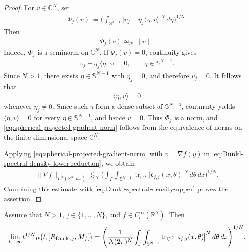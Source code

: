 \documentclass{amsart}
\begin{document}
\begin{proof}
For \(v\in\mathbb C^N\), set
\begin{align*}
\Phi_j(v)
:=
\Bigg(
\int_{\mathbb S^{N-1}}
\big|
v_j-\eta_j\langle\eta,v\rangle
\big|^N
\,d\eta
\Bigg)^{1/N}.
\end{align*}
Then
\begin{align}
\Phi_j(v)
\simeq_N
\|v\|.
\label{eq:spherical-projected-gradient-norm}
\end{align}
Indeed, \(\Phi_j\) is a seminorm on \(\mathbb C^N\). If
\(\Phi_j(v)=0\), continuity gives
\begin{align*}
v_j-\eta_j\langle\eta,v\rangle=0,
\qquad
\eta\in\mathbb S^{N-1}.
\end{align*}
Since \(N>1\), there exists \(\eta\in\mathbb S^{N-1}\) with
\(\eta_j=0\), and therefore \(v_j=0\). It follows that
\begin{align*}
\langle\eta,v\rangle=0
\end{align*}
whenever \(\eta_j\neq0\). Since such \(\eta\) form a dense subset of
\(\mathbb S^{N-1}\), continuity yields
\(\langle\eta,v\rangle=0\) for every
\(\eta\in\mathbb S^{N-1}\), and hence \(v=0\). Thus \(\Phi_j\) is a
norm, and \eqref{eq:spherical-projected-gradient-norm} follows from
the equivalence of norms on the finite dimensional space
\(\mathbb C^N\).

Applying \eqref{eq:spherical-projected-gradient-norm} with
\(v=\nabla f(y)\) in
\eqref{eq:Dunkl-spectral-density-lower-reduction}, we obtain
\begin{align*}
\|\nabla f\|_{L^N(\mathbb R^N,dx)}
\lesssim_N
\Bigg(
\int_\Gamma
\int_{\mathbb S^{N-1}}
\operatorname{tr}_{\mathbb C^G}
\big|
\mathfrak c_{f,j}(x,\theta)
\big|^N
\,d\theta\,dx
\Bigg)^{1/N}.
\end{align*}
Combining this estimate with
\eqref{eq:Dunkl-spectral-density-upper} proves the assertion.
\end{proof}
\begin{lemma}\label{lem:Dunkl-smooth-Weyl-asymptotic}
Assume that \(N>1\), \(j\in\{1,\ldots,N\}\), and \(f\in C_c^\infty(\mathbb R^N)\). Then
\begin{align}
\lim_{t\to\infty}
t^{1/N}
\mu
\big(
t,[R_{{\rm Dunkl},j},M_f]
\big)
=
\Bigg(
\frac{1}{N(2\pi)^N}
\int_\Gamma
\int_{\mathbb S^{N-1}}
\operatorname{tr}_{\mathbb C^G}
\big|
\mathfrak c_{f,j}(x,\theta)
\big|^N
\,d\theta\,dx
\Bigg)^{1/N}.
\label{eq:Dunkl-smooth-Weyl-asymptotic}
\end{align}
\end{lemma}
\end{document}
